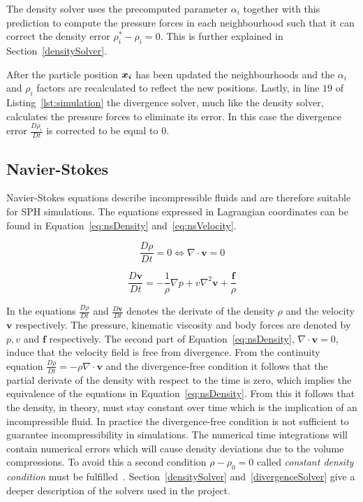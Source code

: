 The density solver uses the precomputed parameter $\alpha_i$ together with this prediction to compute the pressure forces in each neighbourhood such that it can correct the density error $\rho_i^* - \rho_i = 0$.
This is further explained in Section~\ref{densitySolver}.

After the particle position $\bm{x_i}$ has been updated the neighbourhoods and the $\alpha_i$ and $\rho_i$ factors are recalculated to reflect the new positions.
Lastly, in line $19$ of Listing~\ref{lst:simulation} the divergence solver, much like the density solver, calculates the pressure forces to eliminate its error.
In this case the divergence error $\frac{D\rho_i}{Dt}$ is corrected to be equal to $0$.

\subsection{Navier-Stokes}
    Navier-Stokes equations describe incompressible fluids and are therefore suitable for SPH simulations.
    The equations expressed in Lagrangian coordinates can be found in Equation~\ref{eq:nsDensity} and~\ref{eq:nsVelocity}.

    \begin{equation} \label{eq:nsDensity}
        \frac{D\rho}{Dt} = 0 \Leftrightarrow \nabla \cdot \textbf{v} = 0 
    \end{equation}

    \begin{equation} \label{eq:nsVelocity}
        \frac{D\textbf{v}}{Dt} = -\frac{1}{\rho} \nabla p + v \nabla ^2 \textbf{v} + \frac{\textbf{f}}{\rho}
    \end{equation}

    In the equations $\frac{D\rho}{Dt}$ and $\frac{D\textbf{v}}{Dt}$ denotes the derivate of the density $\rho$ and the velocity $\textbf{v}$ respectively.
    The pressure, kinematic viscosity and body forces are denoted by $p,v$ and $\textbf{f}$ respectively.
    The second part of Equation~\ref{eq:nsDensity}, $\nabla \cdot \textbf{v} = 0$, induce that the velocity field is free from divergence.
    From the continuity equation $\frac{D\rho}{Dt} = -\rho \nabla \cdot \textbf{v}$ and the divergence-free condition it follows that the partial derivate of the density with respect to the time is zero, which implies the equivalence of the equations in Equation~\ref{eq:nsDensity}.
    From this it follows that the density, in theory, must stay constant over time which is the implication of an incompressible fluid.
    In practice the divergence-free condition is not sufficient to guarantee incompressibility in simulations.
    The numerical time integrations will contain numerical errors which will cause density deviations due to the volume compressions.
    To avoid this a second condition $\rho - \rho_0 = 0$ called \textit{constant density condition} must be fulfilled~\cite{bender}.
    Section~\ref{densitySolver} and~\ref{divergenceSolver} give a deeper description of the solvers used in the project.


